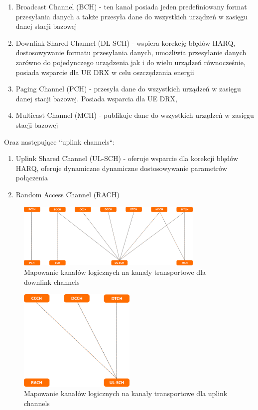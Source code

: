 \begin{enumerate}
	\item Broadcast Channel (BCH) - ten kanał posiada jeden predefiniowany format przesyłania danych a także przesyła dane do wszystkich urządzeń w zasięgu danej stacji bazowej
	\item Downlink Shared Channel (DL-SCH) - wspiera korekcję błędów HARQ, dostosowywanie formatu przesyłania danych, umożliwia przesyłanie danych zarówno do pojedynczego urządzenia jak i do wielu urządzeń równocześnie, posiada wsparcie dla UE DRX w celu oszczędzania energii
	\item Paging Channel (PCH) - przesyła dane do wszystkich urządzeń w zasięgu danej stacji bazowej. Posiada wsparcia dla UE DRX, 
	\item Multicast Channel (MCH) - publikuje dane do wszystkich urządzeń w zasięgu stacji bazowej
\end{enumerate}

Oraz następujące ``uplink channels``:

\begin{enumerate}
	\item Uplink Shared Channel (UL-SCH) - oferuje wsparcie dla korekcji błędów HARQ, oferuje dynamiczne dynamiczne dostosowywanie parametrów połączenia 
	\item Random Access Channel (RACH)
\end{enumerate}

\begin{figure}
	\centerline{\includegraphics[width=0.8\textwidth]{images/mac_downlink_mapping.png}}
	\caption{Mapowanie kanałów logicznych na kanały transportowe dla downlink channels}
	\label{fig:mac_downlink_mapping}
\end{figure}

\begin{figure}
	\centerline{\includegraphics[width=0.5\textwidth]{images/mac_uplink_mapping.png}}
	\caption{Mapowanie kanałów logicznych na kanały transportowe dla uplink channels}
	\label{fig:mac_uplink_mapping}
\end{figure}

